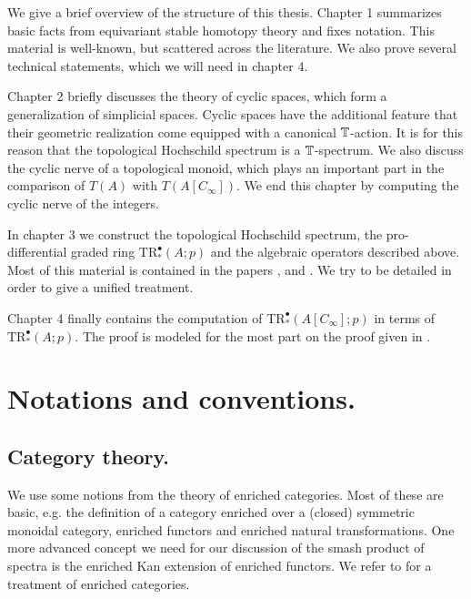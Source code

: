 We give a brief overview of the structure of this thesis.
Chapter 1 summarizes basic facts from equivariant stable homotopy
theory and fixes notation. This material is well-known, but scattered across the literature.
We also prove several technical statements, which we will need in chapter 4.

Chapter 2 briefly discusses the theory of cyclic spaces, which
form a generalization of simplicial spaces. Cyclic spaces have the
additional feature that their geometric realization come equipped with
a canonical $\mathbb{T}$-action. It is for this reason that the topological
Hochschild spectrum is a $\mathbb{T}$-spectrum. We also discuss the cyclic
nerve of a topological monoid, which plays an important part in the 
comparison of $T(A)$ with $T(A[C_\infty])$.
We end this chapter by computing the cyclic nerve of the integers.

In chapter 3 we construct the topological Hochschild spectrum,
the pro-differential graded ring $\mathrm{TR}^\bullet_\ast(A;p)$
and the algebraic operators described above.
Most of this material is contained in the papers
\cite{hesselholtacta}, \cite{hmperfect} and \cite{hmmixed}.
We try to be detailed in order to give a unified treatment.

Chapter 4 finally contains the computation of $\mathrm{TR}^\bullet_\ast(A[C_\infty];p)$
in terms of $\mathrm{TR}^\bullet_\ast(A;p)$.
The proof is modeled for the most part on the proof
given in \cite[Section~3, \pno~18-23]{hmmixed}.
\section*{Notations and conventions.}
\subsection*{Category theory.}
We use some notions from the theory of enriched categories.
Most of these are basic, e.g. the definition of a category
enriched over a (closed) symmetric monoidal category, enriched
functors and enriched natural transformations. One more
advanced concept we need for our discussion of the 
smash product of spectra is the enriched Kan extension of enriched functors.
We refer to \cite{kellyenriched} for a treatment of enriched categories.

